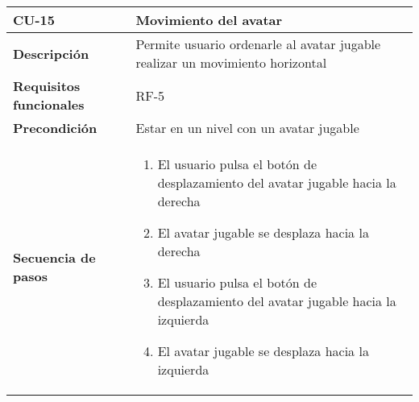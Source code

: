 \begin{longtable}{l|l}
\begin{minipage}{0.25\columnwidth}
\textbf{CU-15} 
\end{minipage}
&
\begin{minipage}{0.65\columnwidth}
Movimiento del avatar
\end{minipage}
\\ \hline

\begin{minipage}{0.25\columnwidth}
\textbf{Descripción} 
\end{minipage}
&
\begin{minipage}{0.65\columnwidth}
Permite usuario ordenarle al avatar jugable realizar un movimiento horizontal
\end{minipage}
\\ \hline

\begin{minipage}{0.25\columnwidth}
\textbf{Requisitos funcionales} 
\end{minipage}
&
\begin{minipage}{0.65\columnwidth}
RF-5
\end{minipage}
\\ \hline

\begin{minipage}{0.25\columnwidth}
\textbf{Precondición} 
\end{minipage}
&
\begin{minipage}{0.65\columnwidth}
Estar en un nivel con un avatar jugable
\end{minipage}
\\ \hline

\begin{minipage}{0.25\columnwidth}
\textbf{Secuencia de pasos} 
\end{minipage}
&
\begin{minipage}{0.65\columnwidth}
\begin{enumerate}
\item
El usuario pulsa el botón de desplazamiento del avatar jugable hacia la derecha
\item
El avatar jugable se desplaza hacia la derecha
\item
El usuario pulsa el botón de desplazamiento del avatar jugable hacia la izquierda
\item
El avatar jugable se desplaza hacia la izquierda
\end{enumerate}
\end{minipage}
\\ \hline


\end{longtable}
